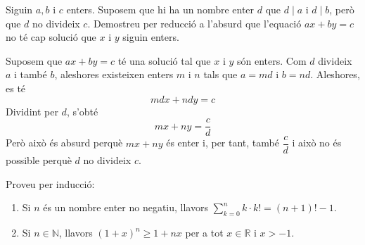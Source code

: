 \begin{exercici}
Siguin $a,b$ i $c$ enters. Suposem que hi ha un nombre enter $d$ que $d\mid a
$ i $d\mid b$, per\`{o} que $d$ no divideix $c$. Demostreu per reducci\'{o} a
l'absurd que l'equaci\'{o} $ax+by=c$ no t\'{e} cap soluci\'{o} que $x$ i $y $
siguin enters.
\end{exercici}

\begin{solucio}
Suposem que $ax+by=c$ t\'{e} una soluci\'{o} tal que $x$ i $y$ s\'{o}n enters.
Com $d$ divideix $a$ i tamb\'{e} $b$, aleshores existeixen enters $m$ i $n$
tals que $a=md$ i $b=nd$. Aleshores, es t\'{e}%
\[
mdx+ndy=c
\]
Dividint per $d$, s'obt\'{e}%
\[
mx+ny=\frac{c}{d}%
\]
Per\`{o} aix\`{o} \'{e}s absurd perqu\`{e} $mx+ny$ \'{e}s enter i, per tant,
tamb\'{e} $\dfrac{c}{d}$ i aix\`{o} no \'{e}s possible perqu\`{e} $d$ no
divideix $c$.
\end{solucio}

\begin{exercici}
Proveu per inducci\'{o}:

\begin{enumerate}
\item Si $n$ \'{e}s un nombre enter no negatiu, llavors $%
{\displaystyle\sum\limits_{k=0}^{n}}
k\cdot k!=\left(  n+1\right)  !-1$.

\item Si $n\in\mathbb{N}$, llavors $\left(  1+x\right)  ^{n}\geq1+nx$ per a
tot $x\in\mathbb{R}$ i $x>-1$.
\end{enumerate}
\end{exercici}

